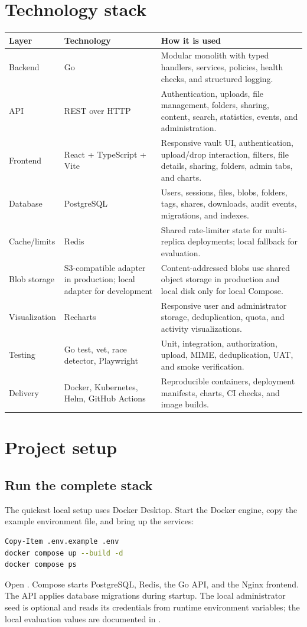 \documentclass[11pt,a4paper]{article}
\begin{document}
\section{Technology stack}
\begin{tabularx}{\textwidth}{P{0.22\textwidth}Y Y}\toprule\textbf{Layer}&\textbf{Technology}&\textbf{How it is used}\\\midrule
Backend&Go&Modular monolith with typed handlers, services, policies, health checks, and structured logging.\\
API&REST over HTTP&Authentication, uploads, file management, folders, sharing, content, search, statistics, events, and administration.\\
Frontend&React + TypeScript + Vite&Responsive vault UI, authentication, upload/drop interaction, filters, file details, sharing, folders, admin tabs, and charts.\\
Database&PostgreSQL&Users, sessions, files, blobs, folders, tags, shares, downloads, audit events, migrations, and indexes.\\
Cache/limits&Redis&Shared rate-limiter state for multi-replica deployments; local fallback for evaluation.\\
Blob storage&S3-compatible adapter in production; local adapter for development&Content-addressed blobs use shared object storage in production and local disk only for local Compose.\\
Visualization&Recharts&Responsive user and administrator storage, deduplication, quota, and activity visualizations.\\
Testing&Go test, vet, race detector, Playwright&Unit, integration, authorization, upload, MIME, deduplication, UAT, and smoke verification.\\
Delivery&Docker, Kubernetes, Helm, GitHub Actions&Reproducible containers, deployment manifests, charts, CI checks, and image builds.\\\bottomrule\end{tabularx}

\section{Project setup}
\subsection{Run the complete stack}
The quickest local setup uses Docker Desktop. Start the Docker engine, copy the example environment file, and bring up the services:
\begin{lstlisting}[language=bash]
Copy-Item .env.example .env
docker compose up --build -d
docker compose ps
\end{lstlisting}
Open . Compose starts PostgreSQL, Redis, the Go API, and the Nginx frontend. The API applies database migrations during startup. The local administrator seed is optional and reads its credentials from runtime environment variables; the local evaluation values are documented in .
\end{document}

